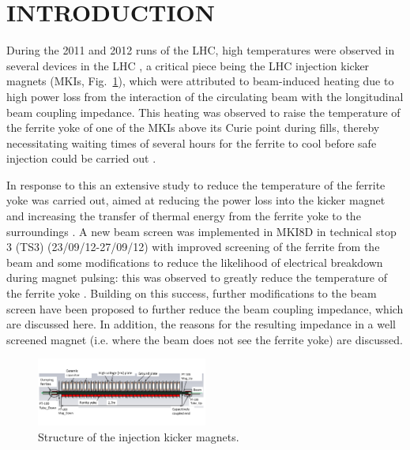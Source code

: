 \documentclass{JAC2003}
\begin{document}
% 

\section{INTRODUCTION}

During the 2011 and 2012 runs of the LHC, high temperatures were observed in several devices in the LHC  \cite{metral_cham2012}, a critical piece being the LHC injection kicker magnets (MKIs, Fig.~\ref{fig:mkiStruct}), which were attributed to beam-induced heating due to high power loss from the interaction of the circulating beam with the longitudinal beam coupling impedance. This heating was observed to raise the temperature of the ferrite yoke of one of the MKIs above its Curie point during fills, thereby necessitating waiting times of several hours for the ferrite to cool before safe injection could be carried out \cite{mki-heating}. 

In response to this an extensive study to reduce the temperature of the ferrite yoke was carried out, aimed at reducing the power loss into the kicker magnet and increasing the transfer of thermal energy from the ferrite yoke to the surroundings \cite{mki-heatingTemp}. A new beam screen was implemented in MKI8D in technical stop 3 (TS3) (23/09/12-27/09/12) with improved screening of the ferrite from the beam and some modifications to reduce the likelihood of electrical breakdown during magnet pulsing: this was observed to greatly reduce the temperature of the ferrite yoke \cite{mki-heatingTemp}. Building on this success, further modifications to the beam screen have been proposed to further reduce the beam coupling impedance, which are discussed here. In addition, the reasons for the resulting impedance in a well screened magnet (i.e. where the beam does not see the ferrite yoke) are discussed. 

\begin{figure}
\includegraphics[width=0.5\textwidth]{MKICrossSectionYZ.pdf}
\caption{Structure of the injection kicker magnets.}
\label{fig:mkiStruct}
\end{figure}
\end{document}
